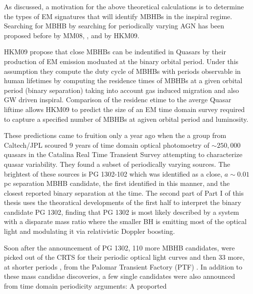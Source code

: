 As discussed, a motivation for the above theoretical calculations is to
determine the types of EM signatures that will identify MBHBs in the inspiral
regime. Searching for MBHB by searching for periodically varying AGN has been
proposed before by MM08, \cite{Haiman+2009}, and by HKM09.
 

HKM09 propose that close MBHBs can be indentified in Quasars by their production of EM emission moduated at the binary orbital period. Under this assumption they compute the duty cycle of MBHBs with periods observable in human lifetimes by computing the residence times of MBHBs at a given orbital period (binary separation) taking into account gas induced migration and also GW driven inspiral. Comparison of the residenc etime to the averge Quasar liftime allows HKM09 to predict the size of an EM time domain survey required to capture a specified number of MBHBs at agiven orbital period and luminosity.



These predictions came to fruition only a year ago when the a group from
Caltech/JPL scoured 9 years of time domain optical photomoetry of
$\sim250,000$ quasars in the Catalina Real Time Transient Survey \citep{CRTS
refs} attempting to characterize quasar variability. They found a subset of
periodically varying sources. The brightest of these sources is PG 1302-102
which was identified as a close, $a \sim 0.01$pc separation MBHB candidate,
the first identified in this manner, and the closest reported binary
separation at the time. The second part of Part I of this thesis uses the
theoratical developments of the first half to interpret the binary candidate
PG 1302, finding that PG 1302 is most likely described by a system with a
disparate mass ratio where the smaller BH is emitting most of the optical
light and modulating it via relativistic Doppler boosting.


Soon after the announcement of PG 1302, 110 more MBHB candidates, were picked
out of the CRTS for their periodic optical light curves \citep{Graham:2015b}
and then 33 more, at shorter periods \citep{CharisiMBHBs:2016}, from the
Palomar Transient Factory (PTF) \citep{PTF}. In addition to these mass candidae
discoveries, a few single candidates were also announced from time domain periodicity arguments: A proported 


